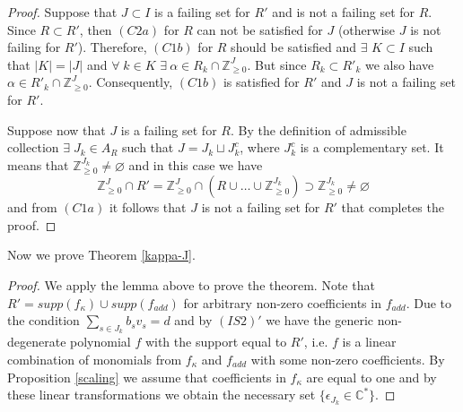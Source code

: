 \documentclass[reqno,12pt]{amsart}
\numberwithin{equation}{section}
\theoremstyle{plain}
\theoremstyle{definition}
\newtheorem{remark}[theorem]{Remark}
\newcommand{\CC}{{\mathbb{C}}}
\newcommand{\ZZ}{{\mathbb{Z}}}
\begin{document}
 \begin{proof} Suppose that $J \subset I$ is a failing set for $R'$ and is not a failing set for $R$. Since $R \subset R'$, then $(C2a)$ for $R$ can not be satisfied for $J$ (otherwise $J$ is not failing for $R'$). Therefore, $(C1b)$ for $R$ should be satisfied and $\exists$ $K \subset I$ such that $|K| = |J|$ and $\forall\; k \in K$ $\exists\ \alpha \in R_k\cap \ZZ_{\geq 0}^J$. But since $R_k \subset R'_k$ we also have $\alpha \in R'_k\cap \ZZ_{\geq 0}^J$. Consequently, $(C1b)$ is satisfied for $R'$ and $J$ is not a failing set for $R'$.

 Suppose now that $J$ is a failing set for $R$. By the definition of admissible collection $\exists\; J_k \in A_R$ such that $J = J_{k} \sqcup J_{k}^c$, where $J_{k}^c$ is a complementary set. It means that $\ZZ_{\geq 0}^{J_k} \neq \varnothing$ and in this case we have \[\ZZ_{\geq 0}^J \cap R' = \ZZ_{\geq 0}^J \cap (R \cup \dots \cup \ZZ_{\geq 0}^{J_k}) \supset \ZZ_{\geq 0}^{J_k} \neq \varnothing\]
 and from $(C1a)$ it follows that $J$ is not a failing set for $R'$ that completes the proof.
 \end{proof}

Now we prove Theorem \ref{kappa-J}.
\begin{proof}
We apply the lemma above to prove the theorem. Note that $R' = supp(f_\kappa) \cup supp(f_{add})$ for arbitrary non-zero coefficients in $f_{add}$. Due to the condition $\sum_{s \in J_k} b_{s}v_{s} = d$ and by $(IS 2)'$ we have the generic non-degenerate polynomial $f$ with the support equal to $R'$, i.e. $f$ is a linear combination of monomials from $f_\kappa$ and $f_{add}$ with some non-zero coefficients. By Proposition \ref{scaling} we assume that coefficients in $f_\kappa$ are equal to one and by these linear transformations we obtain the necessary set $\{\epsilon_{J_k} \in \CC^*\}$.
\end{proof}

\end{document}
